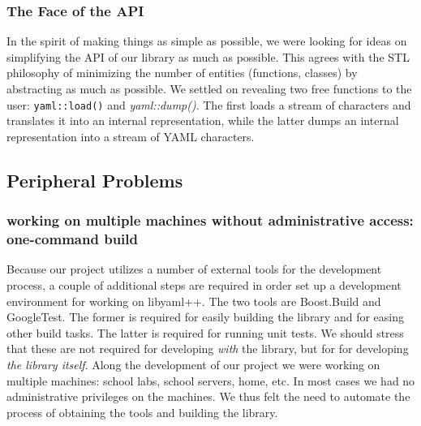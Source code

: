 \documentclass{article}
\begin{document}

\subsubsection{The Face of the API}
In the spirit of making things as simple as possible, we were looking for ideas 
on simplifying the API of our library as much as possible.  This agrees with 
the STL philosophy of minimizing the number of entities (functions, classes) by 
abstracting as much as possible.  We settled on revealing two free functions to 
the user:  \texttt{yaml::load()} and \emph{yaml::dump()}.  The first loads a 
stream of characters and translates it into an internal representation, while 
the latter dumps an internal representation into a stream of YAML characters.

\subsection{Peripheral Problems}


\subsubsection{working on multiple machines without administrative access: one-command build}
Because our project utilizes a number of external tools for the development 
process, a couple of additional steps are required in order set up a 
development environment for working on libyaml++.  The two tools are 
Boost.Build and GoogleTest.  The former is required for easily building the 
library and for easing other build tasks.  The latter is required for running 
unit tests.  We should stress that these are not required for developing 
\emph{with} the library, but for for developing \emph{the library itself}.  
Along the development of our project we were working on multiple machines:  
school labs, school servers, home, etc.  In most cases we had no administrative 
privileges on the machines.  We thus felt the need to automate the process of 
obtaining the tools and building the library.
\end{document}
